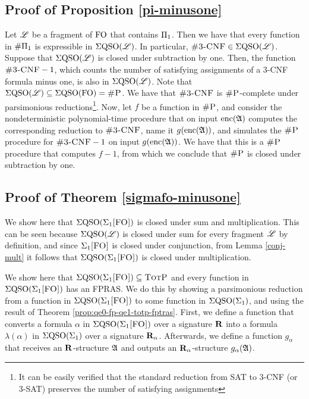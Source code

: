 \subsection*{Proof of Proposition \ref{pi-minusone}}

Let $\mathscr{L}$ be a fragment of ${\rm FO}$ that contains $\Pi_{1}$. Then we have that every function in $\#\Pi_{1}$ is expressible in $\Sigma{\rm QSO}(\mathscr{L})$. In particular, $\ctcnf \in \eqso(\LL)$. Suppose that $\Sigma{\rm QSO}(\mathscr{L})$ is closed under subtraction by one. Then, the function $\ctcnf-1$, which counts the number of satisfying assignments of a 3-CNF formula minus one, is also in $\Sigma{\rm QSO}(\mathscr{L})$. Note that $\Sigma{\rm QSO}(\mathscr{L}) \subseteq \Sigma{\rm QSO}({\rm FO}) = \text{\sc \#P}$. We have that $\ctcnf$ is $\text{\sc \#P}$-complete under parsimonious reductions\footnote{It can be easily verified that the standard reduction from SAT to 3-CNF (or 3-SAT) preserves the number of satisfying assignments}. Now, let $f$ be a function in $\text{\sc \#P}$, and consider the nondeterministic polynomial-time procedure that on input ${\rm enc}(\mathfrak{A})$ computes the corresponding reduction to $\ctcnf$, name it $g({\rm enc}(\mathfrak{A}))$, and simulates the $\text{\sc \#P}$ procedure for $\ctcnf-1$ on input $g({\rm enc}(\mathfrak{A}))$. We have that this is a $\text{\sc \#P}$ procedure that computes $f-1$, from which we conclude that $\text{\sc \#P}$ is closed under subtraction by one.










\subsection*{Proof of Theorem \ref{sigmafo-minusone}}

 We show here that $\Sigma{\rm QSO}(\Sigma_{1}\textsc{[FO]})$ is closed under sum and multiplication. This can be seen because $\Sigma{\rm QSO}(\mathscr{L})$ is closed under sum for every fragment $\mathscr{L}$ by definition, and since $\Sigma_{1}\textsc{[FO]}$ is closed under conjunction, from Lemma \ref{conj-mult} it follows that $\Sigma{\rm QSO}(\Sigma_{1}\textsc{[FO]})$ is closed under multiplication.

\vspace{1em}
  We show here that $\Sigma{\rm QSO}(\Sigma_{1}\textsc{[FO]}) \subseteq \text{\sc TotP}$ and every function in $\Sigma{\rm QSO}(\Sigma_{1}\textsc{[FO]})$ has an FPRAS. We do this by showing a parsimonious reduction from a function in $\Sigma{\rm QSO}(\Sigma_{1}\textsc{[FO]})$ to some function in $\Sigma{\rm QSO}(\Sigma_{1})$, and using the result of Theorem \ref{prop:qe0-fp-qe1-totp-fptras}. First, we define a function that converts a formula $\alpha$ in $\Sigma{\rm QSO}(\Sigma_{1}\textsc{[FO]})$ over a signature $\mathbf{R}$ into a formula $\lambda(\alpha)$ in $\Sigma{\rm QSO}(\Sigma_{1})$ over a signature $\mathbf{R}_{\alpha}$. Afterwards, we define a function $g_{\alpha}$ that receives an $\mathbf{R}$-structure $\mathfrak{A}$ and outputs an $\mathbf{R}_{\alpha}$-structure $g_{\alpha}(\mathfrak{A})$.

